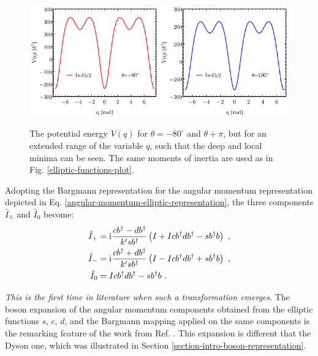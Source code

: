 \begin{figure}
    \centering
    \includegraphics[width=0.49\textwidth]{Chapters/Figures/Elliptic-Potential-deep-1.pdf}
    \includegraphics[width=0.49\textwidth]{Chapters/Figures/Elliptic-Potential-deep-1-180.pdf}
    \caption{The potential energy $V(q)$ for $\theta=-80^\circ$ and $\theta+\pi$, but for an extended range of the variable $q$, such that the deep and local minima can be seen. The same moments of inertia are used as in Fig. \ref{elliptic-functions-plot}.}
    \label{elliptic-potential-plot-deep-mininma}
\end{figure}

Adopting the Bargmann representation for the angular momentum representation depicted in Eq. \ref{angular-momentum-elliptic-representation}, the three components $\hat{I}_{\mp}$ and $\hat{I}_0$ become:
\begin{align}
    \hat{I}_+&=\mathrm{i}\mkern1mu\frac{cb^\dagger-db^\dagger}{k'sb^\dagger}\left(I+Icb^\dagger db^\dagger-sb^\dagger b\right)\ ,\nonumber\\
    \hat{I}_-&=\mathrm{i}\mkern1mu\frac{cb^\dagger+db^\dagger}{k'sb^\dagger}\left(I-Icb^\dagger d b^\dagger+sb^\dagger b\right)\ ,\nonumber\\
    \hat{I}_0&=Icb^\dagger db^\dagger-sb^\dagger b\ .
    \label{angular-momentum-elliptic-bargmann}
\end{align}

\emph{This is the first time in literature when such a transformation emerges}. The boson expansion of the angular momentum components obtained from the elliptic functions $s$, $c$, $d$, and the Bargmann mapping applied on the same components is the remarking feature of the work from Ref. \cite{raduta2020new}. This expansion is different that the Dyson one, which was illustrated in Section \ref{section-intro-boson-representation}.

